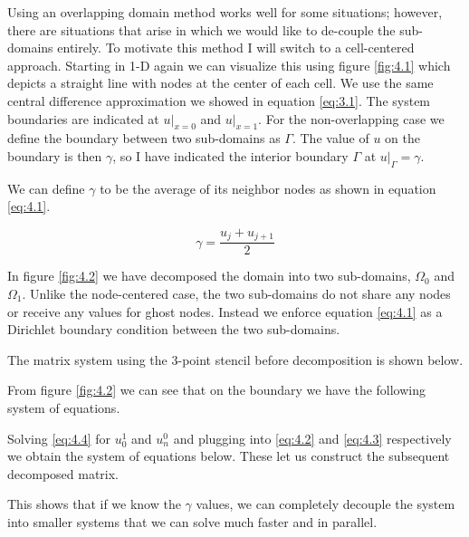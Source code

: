 Using an overlapping domain method works well for some situations; however, there are situations that arise in which we would like to de-couple the sub-domains entirely. To motivate this method I will switch to a cell-centered approach. Starting in 1-D again we can visualize this using figure \ref{fig:4.1} which depicts a straight line with nodes at the center of each cell. We use the same central difference approximation we showed in equation \ref{eq:3.1}. The system boundaries are indicated at $u|_{x=0}$ and $u|_{x=1}$. For the non-overlapping case we define the boundary between two sub-domains as $\Gamma$. The value of $u$ on the boundary is then $\gamma$, so I have indicated the interior boundary $\Gamma$ at ${u|_{\Gamma} = \gamma}$.



We can define $\gamma$ to be the average of its neighbor nodes as shown in equation \ref{eq:4.1}.

\begin{equation}\label{eq:4.1}
	\gamma = \frac{u_{j} + u_{j+1}}{2}
\end{equation}

In figure \ref{fig:4.2} we have decomposed the domain into two sub-domains, $\Omega_0$ and $\Omega_1$. Unlike the node-centered case, the two sub-domains do not share any nodes or receive any values for ghost nodes. Instead we enforce equation \ref{eq:4.1} as a Dirichlet boundary condition between the two sub-domains. 

\pagebreak


The matrix system using the 3-point stencil before decomposition is shown below.



From figure \ref{fig:4.2} we can see that on the boundary we have the following system of equations.



Solving \ref{eq:4.4} for $u_0^1$ and $u_n^0$ and plugging into \ref{eq:4.2} and \ref{eq:4.3} respectively we obtain the system of equations below. These let us construct the subsequent decomposed matrix.




This shows that if we know the $\gamma$ values, we can completely decouple the system into smaller systems that we can solve much faster and in parallel.





